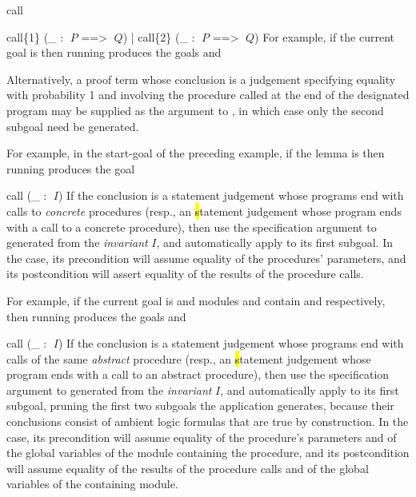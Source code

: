 \begin{tactic}{call}
\begin{tsyntax}{call\{1\} (_ : $\;P$ ==> $\;Q$) | call\{2\} (_ : $\;P$ ==> $\;Q$)}
  For example, if the current goal is
  then running
   produces the
  goals  and

  \bigskip Alternatively, a proof term whose conclusion is a \phl
  judgement specifying equality with probability 1 and involving the
  procedure called at the end of the designated program may be
  supplied as the argument to , in which case only the second
  subgoal need be generated.

  \medskip
  For example, in the start-goal of the preceding example,
  if the lemma  is
  then running
   produces the
  goal 
  \end{tsyntax}

  \begin{tsyntax}{call (_ : $\;I$)}
    If the conclusion is a \prhl statement judgement whose programs
    end with calls to \emph{concrete} procedures (resp., an \hl
    statement judgement whose program ends with a call to a concrete
    procedure), then use the specification argument to 
    generated from the \emph{invariant} $I$, and automatically apply
     to its first subgoal.  In the \prhl case, its
    precondition will assume equality of the procedures' parameters,
    and its postcondition will assert equality of the results of the
    procedure calls.

    \medskip
    For example, if the current goal is
    and modules  and  contain
     and
    respectively, then
    running 
    produces the goals
     and
  \end{tsyntax}

  \begin{tsyntax}{call (_ : $\;I$)}
    If the conclusion is a \prhl statement judgement whose programs
    end with calls of the same \emph{abstract} procedure (resp., an
    \hl statement judgement whose program ends with a call to an
    abstract procedure), then use the specification argument to
     generated from the \emph{invariant} $I$, and
    automatically apply  to its first subgoal, pruning
    the first two subgoals the application generates, because their
    conclusions consist of ambient logic formulas that are true by
    construction.  In the \prhl case, its precondition will assume
    equality of the procedure's parameters and of the global variables
    of the module containing the procedure, and its postcondition will
    assume equality of the results of the procedure calls and of the
    global variables of the containing module.


\end{tsyntax}
\end{tactic}
